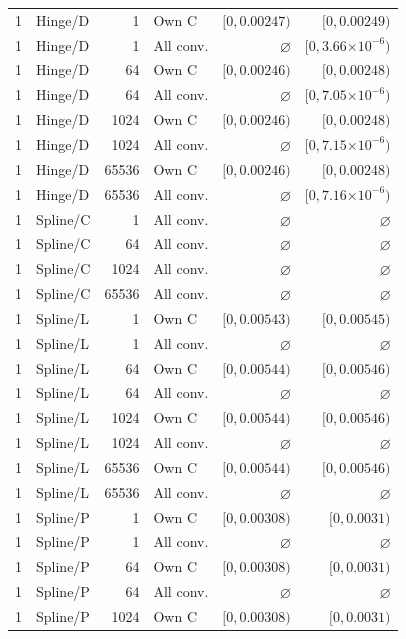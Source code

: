 \begin{longtable}{llrlrr}
1 & Hinge/D & 1 & Own C & $[0, 0.00247)$ & $[0, 0.00249)$ \\
1 & Hinge/D & 1 & All conv. & $\varnothing$ & $[0, 3.66\mathord{\times}10^{-6})$ \\
1 & Hinge/D & 64 & Own C & $[0, 0.00246)$ & $[0, 0.00248)$ \\
1 & Hinge/D & 64 & All conv. & $\varnothing$ & $[0, 7.05\mathord{\times}10^{-6})$ \\
1 & Hinge/D & 1024 & Own C & $[0, 0.00246)$ & $[0, 0.00248)$ \\
1 & Hinge/D & 1024 & All conv. & $\varnothing$ & $[0, 7.15\mathord{\times}10^{-6})$ \\
1 & Hinge/D & 65536 & Own C & $[0, 0.00246)$ & $[0, 0.00248)$ \\
1 & Hinge/D & 65536 & All conv. & $\varnothing$ & $[0, 7.16\mathord{\times}10^{-6})$ \\
1 & Spline/C & 1 & All conv. & $\varnothing$ & $\varnothing$ \\
1 & Spline/C & 64 & All conv. & $\varnothing$ & $\varnothing$ \\
1 & Spline/C & 1024 & All conv. & $\varnothing$ & $\varnothing$ \\
1 & Spline/C & 65536 & All conv. & $\varnothing$ & $\varnothing$ \\
1 & Spline/L & 1 & Own C & $[0, 0.00543)$ & $[0, 0.00545)$ \\
1 & Spline/L & 1 & All conv. & $\varnothing$ & $\varnothing$ \\
1 & Spline/L & 64 & Own C & $[0, 0.00544)$ & $[0, 0.00546)$ \\
1 & Spline/L & 64 & All conv. & $\varnothing$ & $\varnothing$ \\
1 & Spline/L & 1024 & Own C & $[0, 0.00544)$ & $[0, 0.00546)$ \\
1 & Spline/L & 1024 & All conv. & $\varnothing$ & $\varnothing$ \\
1 & Spline/L & 65536 & Own C & $[0, 0.00544)$ & $[0, 0.00546)$ \\
1 & Spline/L & 65536 & All conv. & $\varnothing$ & $\varnothing$ \\
1 & Spline/P & 1 & Own C & $[0, 0.00308)$ & $[0, 0.0031)$ \\
1 & Spline/P & 1 & All conv. & $\varnothing$ & $\varnothing$ \\
1 & Spline/P & 64 & Own C & $[0, 0.00308)$ & $[0, 0.0031)$ \\
1 & Spline/P & 64 & All conv. & $\varnothing$ & $\varnothing$ \\
1 & Spline/P & 1024 & Own C & $[0, 0.00308)$ & $[0, 0.0031)$ \\

\end{longtable}
